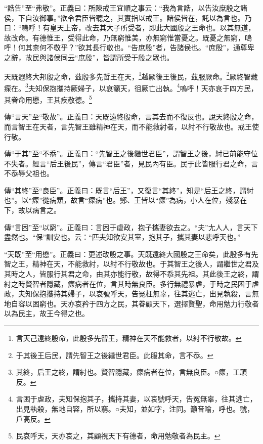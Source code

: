 {\noindent\shu{}\fzkt “誥告”至“弗敬”。正義曰：所陳戒王宜順之事云：“我為言誥，以告汝庶殷之諸侯，下自汝御事。”欲令君臣皆聽之，其實指以戒王。諸侯皆在，託以為言也。乃曰：“嗚呼！有皇天上帝，改去其大子所受者，即此大國殷之王命也。以其無道，故改命。有德惟王，受得此命，乃無窮惟美，亦無窮惟當憂之。既憂之無窮，嗚呼！何其柰何不敬乎？”欲其長行敬也。“告庶殷”者，告諸侯也。“庶殷”，通尊卑之辭，故民與諸侯同云“庶殷”，皆謂所受于殷之眾也。 \par}

天既遐終大邦殷之命，茲殷多先哲王在天，\footnote{言天己遠終殷命，此殷多先智王，精神在天不能救者，以紂不行敬故。}越厥後王後民，茲服厥命。\footnote{于其後王后民，謂先智王之後繼世君臣。此服其命，言不忝。}厥終智藏瘝在。\footnote{其終，后王之終，謂紂也。賢智隱藏，瘝病者在位，言無良臣。○瘝，工頑反。}夫知保抱攜持厥婦子，以哀籲天，徂厥亡出執。\footnote{言困于虐政，夫知保抱其子，攜持其妻，以哀號呼天，告冤無辜，往其逃亡，出見執殺，無地自容，所以窮。○夫知，並如字，注同。籲音喻，呼也。號，戶高反。}嗚呼！天亦哀于四方民，其眷命用懋，王其疾敬德。\footnote{民哀呼天，天亦哀之，其顧視天下有德者，命用勉敬者為民主。}


{\noindent\zhuan{}\fzbyks 傳“言天”至“敬故”。正義曰：天既遠終殷命，言其去而不復反也。說天終殷之命，而言智王在天者，言先智王雖精神在天，而不能救紂者，以紂不行敬故也。戒王使行敬。 \par}

{\noindent\zhuan{}\fzbyks 傳“于其”至“不忝”。正義曰：“先智王之後繼世君臣”，謂智王之後，紂已前能守位不失者。經言“后王後民”，傳言“君臣”者，見民內有臣。民于此皆服行君之命，言不忝辱父祖也。 \par}

{\noindent\zhuan{}\fzbyks 傳“其終”至“良臣”。正義曰：既言“后王”，又復言“其終”，知是“后王之終，謂紂也”。以“瘝”從病類，故言“瘝病”也。鄭、王皆以“瘝”為病，小人在位，殘暴在下，故以病言之。 \par}

{\noindent\zhuan{}\fzbyks 傳“言困”至“以窮”。正義曰：言困于虐政，抱子攜妻欲去之。“夫”尢人人，言天下盡然也。“保”訓安也。云：“匹夫知欲安其室，抱其子，攜其妻以悲呼天也。” \par}

{\noindent\shu{}\fzkt “天既”至“用懋”。正義曰：更述改殷之事。天既遠終大國殷之王命矣，此殷多有先智之王，精神在天，不能救紂，以紂不行敬故也。于其智王之後人，謂繼世之君及其時之人，皆服行其君之命，由其亦能行敬，故得不忝其先祖。其此後王之終，謂紂之時賢智者隱藏，瘝病者在位，言其時無良臣。多行無禮暴虐，于時之民困于虐政，夫知保抱攜持其婦子，以哀號呼天，告冤枉無辜，往其逃亡，出見執殺，言無地自容以困窮也。天亦哀矜于四方之民，其眷顧天下，選擇賢聖，命用勉力行敬者以為民主，故王今得之也。 \par}


